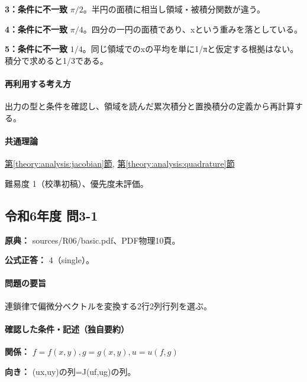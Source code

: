 \noindent\textbf{3：条件に不一致} \(\pi/2\)。半円の面積に相当し領域・被積分関数が違う。\par

\noindent\textbf{4：条件に不一致} \(\pi/4\)。四分の一円の面積であり、xという重みを落としている。\par

\noindent\textbf{5：条件に不一致} \(1/4\)。同じ領域でのxの平均を単に1/πと仮定する根拠はない。積分で求めると1/3である。\par

\paragraph{再利用する考え方} 出力の型と条件を確認し、領域を読んだ累次積分と置換積分の定義から再計算する。

\paragraph{共通理論} \hyperref[theory:analysis:jacobian]{第\ref*{theory:analysis:jacobian}節}, \hyperref[theory:analysis:quadrature]{第\ref*{theory:analysis:quadrature}節}

\par 難易度 1（校準初稿）、優先度未評価。

\subsection{令和6年度 問3-1}
\label{q:r06-reg-basic-3-1}

\noindent\textbf{原典：} sources/R06/basic.pdf、PDF物理10頁。

\textbf{公式正答：} 4（single）。

\paragraph{問題の要旨} 連鎖律で偏微分ベクトルを変換する2行2列行列を選ぶ。

\paragraph{確認した条件・記述（独自要約）}\mbox{}\par

\noindent\textbf{関係：} \(f=f(x,y),g=g(x,y),u=u(f,g)\)\par

\noindent\textbf{向き：} (ux,uy)の列=J(uf,ug)の列。\par

